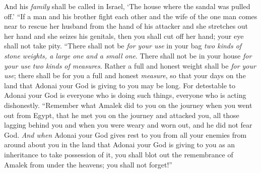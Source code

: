 \begin{biblechapter}
\verse And his \textit{family} shall be called in Israel, ‘The house where the sandal was pulled off.’
\verse “If a man and his brother fight each other and the wife of the one man comes near to rescue her husband from the hand of his attacker and she stretches out her hand and she seizes his genitals,
\verse then you shall cut off her hand; your eye shall not take pity.
\verse “There shall not be \textit{for your use} in your bag \textit{two kinds of stone weights, a large one and a small one}.
\verse There shall not be in your house \textit{for your use} \textit{two kinds of measures}.
\verse Rather a full and honest weight shall be \textit{for your use}; there shall be for you a full and honest \textit{measure}, so that your days on the land that Adonai your God is giving to you may be long.
\verse For detestable to Adonai your God is everyone who is doing such things, everyone who is acting dishonestly.
\verse “Remember what Amalek did to you on the journey when you went out from Egypt,
\verse that he met you on the journey and attacked you, all those lagging behind you and when you were weary and worn out, and he did not fear God.
\verse \textit{And when} Adonai your God gives rest to you from all your enemies from around about you in the land that Adonai your God is giving to you as an inheritance to take possession of it, you shall blot out the remembrance of Amalek from under the heavens; you shall not forget!”
\end{biblechapter}

